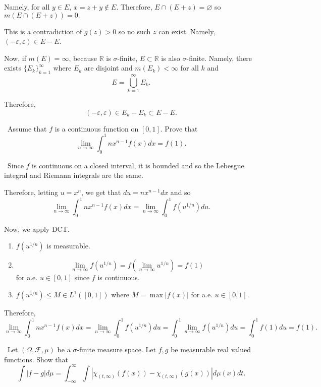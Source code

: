 \documentclass[12pt]{Qual}
\begin{document}
\begin{solution}
\begin{enumerate}[label=(\alph*)]
    Namely, for all $y\in E$, $x=z+y\notin E$. Therefore, $E\cap(E+z)=\varnothing$ so $m(E\cap (E+z))=0.$

    This is a contradiction of $g(z)>0$ so no such $z$ can exist. Namely, $(-\varepsilon,\varepsilon)\in E-E$.

    Now, if $m(E)=\infty$, because $\mathbb{R}$ is $\sigma$-finite, $E\subset\mathbb{R}$ is also $\sigma$-finite. Namely, there exists $\{E_k\}_{k=1}^\infty$ where $E_k$ are disjoint and $m(E_k)<\infty$ for all $k$ and $$E=\bigcup_{k=1}^\infty E_k.$$

    Therefore, $$(-\varepsilon,\varepsilon)\in E_k-E_k\subset E-E.$$
\end{enumerate}
\end{solution}
\newpage




\begin{problem} $\,$
Assume that $f$ is a continuous function on $[0,1]$. Prove that $$\lim_{n\to\infty}\int_0^1nx^{n-1}f(x)dx=f(1).$$
\end{problem}


\begin{solution}$\,$
Since $f$ is continuous on a closed interval, it is bounded and so the Lebesgue integral and Riemann integrals are the same.

Therefore, letting $u=x^n$, we get that $du=nx^{n-1}dx$ and so $$\lim_{n\to\infty}\int_0^1nx^{n-1}f(x)dx=\lim_{n\to\infty}\int_0^1f(u^{1/n})du.$$

Now, we apply DCT.
\begin{enumerate}
    \item $f(u^{1/n})$ is measurable.
    \item $$\lim_{n\to\infty}f(u^{1/n})=f\left(\lim_{n\to\infty}u^{1/n}\right)=f(1)$$ for a.e. $u\in[0,1]$ since $f$ is continuous.
    \item $f(u^{1/n})\le M\in L^1([0,1])$ where $M=\max|f(x)|$ for a.e. $u\in[0,1].$
\end{enumerate}

Therefore, $$\lim_{n\to\infty}\int_0^1nx^{n-1}f(x)dx=\lim_{n\to\infty}\int_0^1f(u^{1/n})du=\int_0^1\lim_{n\to\infty}f(u^{1/n})du=\int_0^1f(1)du=f(1).$$
\end{solution}
\newpage



\begin{problem} $\,$
Let $(\Omega,\mathscr{F},\mu)$ be a $\sigma$-finite measure space. Let $f,g$ be measurable real valued functions. Show that $$\int|f-g|d\mu=\int_{-\infty}^\infty\int\left|\chi_{(t,\infty)}(f(x))-\chi_{(t,\infty)}(g(x))\right|d\mu(x)dt.$$
\end{problem}
\end{document}
